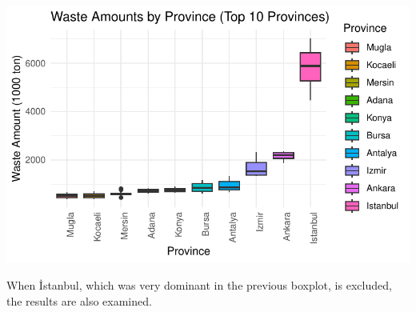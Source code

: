 \documentclass[
  11pt,
  a4paper,
  DIV=11,
  numbers=noendperiod]{scrartcl}
\begin{document}
\includegraphics{project_files/figure-pdf/unnamed-chunk-26-1.pdf}

When İstanbul, which was very dominant in the previous boxplot, is
excluded, the results are also examined.
\end{document}
